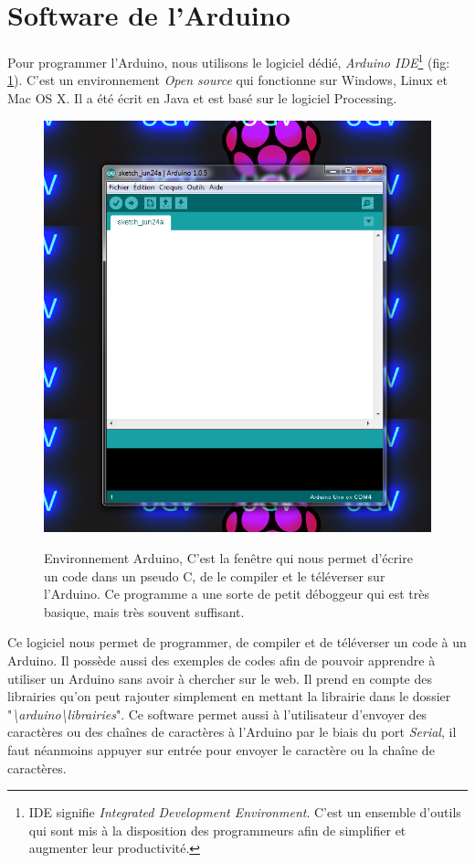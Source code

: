 \documentclass[a4paper,11pt]{report}
\begin{document}
{\section{Software de l'Arduino}
Pour programmer l'Arduino, nous utilisons le logiciel dédié, \textit{Arduino IDE}\footnote{IDE signifie \textit{Integrated Development Environment}. C'est un ensemble d'outils qui sont mis à la disposition des programmeurs afin de simplifier et augmenter leur productivité.} (fig: \ref{Environnement Arduino}). C'est un environnement \textit{Open source} qui fonctionne sur Windows, Linux et Mac OS X. Il a été écrit en Java et est basé sur le logiciel Processing.
\begin{figure}[h!]
\begin{center}
\includegraphics[scale=0.5]{arduino-environnement-1}\\
\caption[Environnement de programmation Arduino]{Environnement Arduino\label{Environnement Arduino}, C'est la fenêtre qui nous permet d'écrire un code dans un pseudo C, de le compiler et le téléverser sur l'Arduino. Ce programme a une sorte de petit déboggeur qui est très basique, mais très souvent suffisant.}
\end{center}
\end{figure}
Ce logiciel nous permet de programmer, de compiler et de téléverser un code à un Arduino. Il possède aussi des exemples de codes afin de pouvoir apprendre à utiliser un Arduino sans avoir à chercher sur le web. Il prend en compte des librairies qu'on peut rajouter simplement en mettant la librairie dans le dossier "\textit{\textbackslash arduino\textbackslash librairies}". Ce software permet aussi à l'utilisateur d'envoyer des caractères ou des chaînes de caractères à l'Arduino par le biais du port \textit{Serial}, il faut néanmoins appuyer sur entrée pour envoyer le caractère ou la chaîne de caractères.


}
\end{document}
